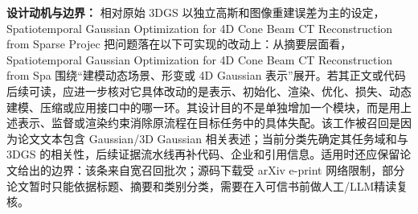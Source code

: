 \textbf{设计动机与边界：} 相对原始 3DGS 以独立高斯和图像重建误差为主的设定，Spatiotemporal Gaussian Optimization for 4D Cone Beam CT Reconstruction from Sparse Projec 把问题落在以下可实现的改动上：从摘要层面看，Spatiotemporal Gaussian Optimization for 4D Cone Beam CT Reconstruction from Spa 围绕“建模动态场景、形变或 4D Gaussian 表示”展开。若其正文或代码后续可读，应进一步核对它具体改动的是表示、初始化、渲染、优化、损失、动态建模、压缩或应用接口中的哪一环。其设计目的不是单独增加一个模块，而是用上述表示、监督或渲染约束消除原流程在目标任务中的具体失配。该工作被召回是因为论文文本包含 Gaussian/3D Gaussian 相关表述；当前分类先确定其任务域和与 3DGS 的相关性，后续证据流水线再补代码、企业和引用信息。适用时还应保留论文给出的边界：该条来自宽召回批次；源码下载受 arXiv e-print 网络限制，部分论文暂时只能依据标题、摘要和类别分类，需要在入可信书前做人工/LLM精读复核。
